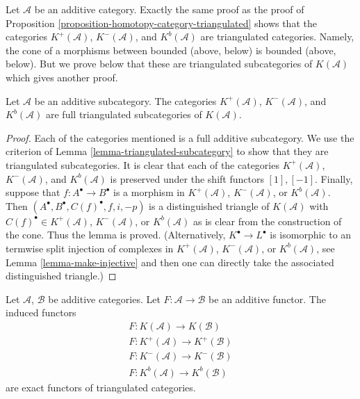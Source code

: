 \begin{remark}
\label{remark-boundedness-conditions-triangulated}
Let $\mathcal{A}$ be an additive category.
Exactly the same proof as the proof of
Proposition \ref{proposition-homotopy-category-triangulated}
shows that the categories
$K^{+}(\mathcal{A})$, $K^{-}(\mathcal{A})$, and $K^b(\mathcal{A})$
are triangulated categories. Namely, the cone of a morphisms between
bounded (above, below) is bounded (above, below).
But we prove below that these are triangulated subcategories
of $K(\mathcal{A})$ which gives another proof.
\end{remark}

\begin{lemma}
\label{lemma-bounded-triangulated-subcategories}
Let $\mathcal{A}$ be an additive subcategory. The categories
$K^{+}(\mathcal{A})$, $K^{-}(\mathcal{A})$, and $K^b(\mathcal{A})$
are full triangulated subcategories of $K(\mathcal{A})$.
\end{lemma}

\begin{proof}
Each of the categories mentioned is a full additive subcategory.
We use the criterion of
Lemma \ref{lemma-triangulated-subcategory}
to show that they are triangulated subcategories.
It is clear that each of the categories
$K^{+}(\mathcal{A})$, $K^{-}(\mathcal{A})$, and $K^b(\mathcal{A})$
is preserved under the shift functors $[1], [-1]$.
Finally, suppose that $f : A^\bullet \to B^\bullet$ is a morphism
in $K^{+}(\mathcal{A})$, $K^{-}(\mathcal{A})$, or $K^b(\mathcal{A})$.
Then $(A^\bullet, B^\bullet, C(f)^\bullet, f, i, -p)$ is a distinguished
triangle of $K(\mathcal{A})$ with $C(f)^\bullet \in K^{+}(\mathcal{A})$,
$K^{-}(\mathcal{A})$, or $K^b(\mathcal{A})$ as is clear from the construction
of the cone. Thus the lemma is proved. (Alternatively,
$K^\bullet \to L^\bullet$ is isomorphic to an termwise split injection
of complexes in $K^{+}(\mathcal{A})$, $K^{-}(\mathcal{A})$, or
$K^b(\mathcal{A})$, see
Lemma \ref{lemma-make-injective}
and then one can directly take the associated
distinguished triangle.)
\end{proof}

\begin{lemma}
\label{lemma-additive-exact-homotopy-category}
Let $\mathcal{A}$, $\mathcal{B}$ be additive categories.
Let $F : \mathcal{A} \to \mathcal{B}$ be an additive functor.
The induced functors
$$
\begin{matrix}
F : K(\mathcal{A}) \longrightarrow K(\mathcal{B}) \\
F : K^{+}(\mathcal{A}) \longrightarrow K^{+}(\mathcal{B}) \\
F : K^{-}(\mathcal{A}) \longrightarrow K^{-}(\mathcal{B}) \\
F : K^b(\mathcal{A}) \longrightarrow K^b(\mathcal{B})
\end{matrix}
$$
are exact functors of triangulated categories.
\end{lemma}

